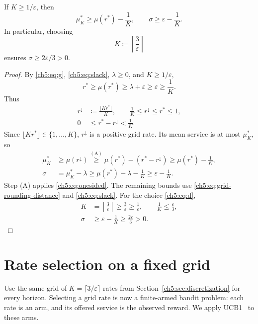 \begin{Thm:Lemma}
\label{ch5:lem:grid}
If $K\ge1/\varepsilon$, then
\[
 \mu_K^*\ge \mu(r^*)-\frac1K,
 \qquad \sigma\ge\varepsilon-\frac1K.
\]
In particular, choosing
\begin{equation}
 K\coloneqq\left\lceil\frac3\varepsilon\right\rceil
 \label{ch5:eq:d}
\end{equation}
ensures $\sigma\ge2\varepsilon/3>0$.
\end{Thm:Lemma}
\begin{proof}
By \eqref{ch5:eq:g}, \eqref{ch5:eq:slack}, $\lambda\ge0$, and
$K\ge1/\varepsilon$,
\[
 r^*\ge\mu(r^*)\ge\lambda+\varepsilon\ge\varepsilon\ge\frac1K.
\]
Thus
\begin{align}
 r^\downarrow&\coloneqq\frac{\lfloor Kr^*\rfloor}{K},
 \qquad \frac1K\le r^\downarrow\le r^*\le1,
 \label{ch5:eq:grid-rounded-rate}\\
 0&\le r^*-r^\downarrow<\frac1K.
 \label{ch5:eq:grid-rounding-distance}
\end{align}
Since $\lfloor Kr^*\rfloor\in\{1,\ldots,K\}$, $r^\downarrow$ is a
positive grid rate. Its mean service is at most $\mu_K^*$, so
\begin{align}
 \mu_K^*&\ge\mu(r^\downarrow)
 \overset{\mathrm{(A)}}{\ge}\mu(r^*)-(r^*-r^\downarrow)
 \ge\mu(r^*)-\frac1K,
 \label{ch5:eq:grid-mean-service-lower}\\
 \sigma&=\mu_K^*-\lambda\ge\mu(r^*)-\lambda-\frac1K
 \ge\varepsilon-\frac1K.
 \label{ch5:eq:grid-slack-lower}
\end{align}
Step (A) applies \eqref{ch5:eq:onesided}. The remaining bounds use
\eqref{ch5:eq:grid-rounding-distance} and \eqref{ch5:eq:slack}.
For the choice \eqref{ch5:eq:d},
\begin{align}
 K&=\left\lceil\frac3\varepsilon\right\rceil\ge\frac3\varepsilon
 \ge\frac1\varepsilon,\qquad \frac1K\le\frac\varepsilon3,
 \label{ch5:eq:grid-spacing-upper}\\
 \sigma&\ge\varepsilon-\frac1K\ge\frac{2\varepsilon}{3}>0.
 \label{ch5:eq:grid-positive-slack}
\end{align}
\end{proof}

\section{Rate selection on a fixed grid}
\label{ch5:upper:sec:algorithm}

Use the same grid of $K=\lceil3/\varepsilon\rceil$ rates from
Section~\ref{ch5:sec:discretization} for every horizon. Selecting a grid rate is now a
finite-armed bandit problem: each rate is an arm, and its offered service
is the observed reward. We apply UCB1~\cite{Auer2002FinitetimeAO} to these
arms.

